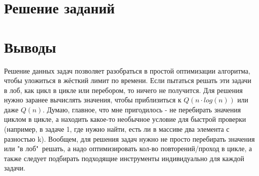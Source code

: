 \documentclass[oneside,a4paper,14pt]{extarticle} %
\begin{document}
	\section*{Решение заданий}
	
	\section*{Выводы} Решение данных задач позволяет разобраться в простой оптимизации алгоритма,
	чтобы уложиться в жёсткий лимит по времени. Если пытаться решать эти задачи в лоб, как цикл в цикле или перебором,
	то ничего не получится. Для решения нужно заранее вычислять значения, чтобы приблизиться к $Q(n \cdot log(n))$ или даже $Q(n)$. 
	Думаю, главное, что мне пригодилось - не перебирать значения циклом в цикле, а находить какое-то необычное условие для быстрой проверки
	(например, в задаче 1, где нужно найти, есть ли в массиве два элемента с разностью k).
	Вообщем, для решения задач нужно не просто перебирать значения или "в лоб"\ решать, а надо оптимизировать кол-во повторений/проход в цикле,
	а также следует подбирать подходящие инструменты индивидуально для каждой задачи.
	
	
\end{document}
